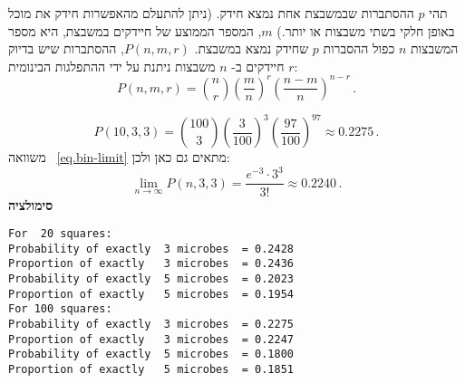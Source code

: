 \solution{}

תהי 
$p$
ההסתברות שבמשבצת אחת נמצא חידק. (ניתן להתעלם מהאפשרות חידק את מוכל באופן חלקי בשתי משבצות או יותר.) 
$m$,
המספר הממוצע של חיידקים במשבצת, היא מספר המשבצות
$n$
כפול ההסברות 
$p$
שחידק נמצא במשבצת. 
$P(n,m,r)$,
ההסתברות שיש בדיוק 
$r$
חיידקים ב-%
$n$
משבצות ניתנת על ידי ההתפלגות הבינומית:
\[
P(n,m,r) = {n \choose r} \left(\frac{m}{n}\right)^r \left(\frac{n-m}{n}\right)^{n-r}\,.
\]

\[
P(10,3,3) = {100 \choose 3} \left(\frac{3}{100}\right)^3 \left(\frac{97}{100}\right)^{97}\approx 0.2275\,.
\]
משוואה%
~\ref{eq.bin-limit}
מתאים גם כאן ולכן:
\[
\lim_{n\rightarrow \infty} P(n,3,3) = \frac{e^{-3}\cdot 3^3}{3!}\approx 0.2240\,.
\]
\textbf{סימולציה}
\begin{verbatim}
For  20 squares:
Probability of exactly  3 microbes  = 0.2428
Proportion of exactly   3 microbes  = 0.2436
Probability of exactly  5 microbes  = 0.2023
Proportion of exactly   5 microbes  = 0.1954
For 100 squares:
Probability of exactly  3 microbes  = 0.2275
Proportion of exactly   3 microbes  = 0.2247
Probability of exactly  5 microbes  = 0.1800
Proportion of exactly   5 microbes  = 0.1851
\end{verbatim}



